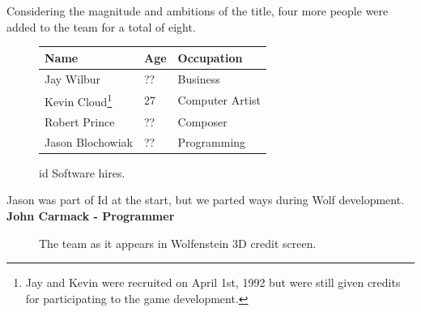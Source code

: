 \documentclass[book.tex]{subfiles}
\begin{document}
Considering the magnitude and ambitions of the title, four more people were added to the team for a total of eight.\\
 \begin{figure}[H]
\centering  
\begin{tabularx}{\textwidth}{ X  X  X  }
  \toprule
  \textbf{Name} &  \textbf{Age} & \textbf{Occupation} \\
  \toprule 
   Jay Wilbur & ?? &  Business\\
   Kevin Cloud\footnote{Jay and Kevin were recruited on April 1st, 1992 but were still given credits for participating to the game development.} & 27 &  Computer Artist\\
   Robert Prince & ?? &  Composer\\
   Jason Blochowiak & ?? &   Programming\\
     \toprule
\end{tabularx}
\caption{id Software hires.}\label{fig:Id Software hires}
\end{figure}

\begin{fancyquotes}
Jason was part of Id at the start, but we parted ways during Wolf development.
 \bigskip \\
\textbf{John Carmack - Programmer}
 \end{fancyquotes}
 
\begin{figure}[H]
\centering
\caption{The team as it appears in Wolfenstein 3D credit screen.}
\label{fig:id_team_1993}
\end{figure}
 
\end{document}

